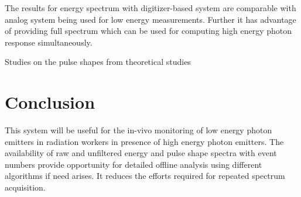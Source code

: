 \documentclass[10pt]{article}
\begin{document}
 

  The results for energy spectrum with digitizer-based system are comparable with analog system being used for low energy measurements. Further it has advantage of providing full spectrum which can be used for computing high energy photon response simultaneously.  

 Studies on the pulse shapes from theoretical studies

 
 

  \section*{Conclusion }This system will be useful for the in-vivo monitoring of low energy photon emitters in radiation workers in presence of high energy photon emitters. The availability of raw and unfiltered energy and pulse shape spectra with event numbers provide opportunity for detailed offline analysis using different algorithms if need arises. It reduces the efforts required for repeated spectrum acquisition.  


\end{document}
